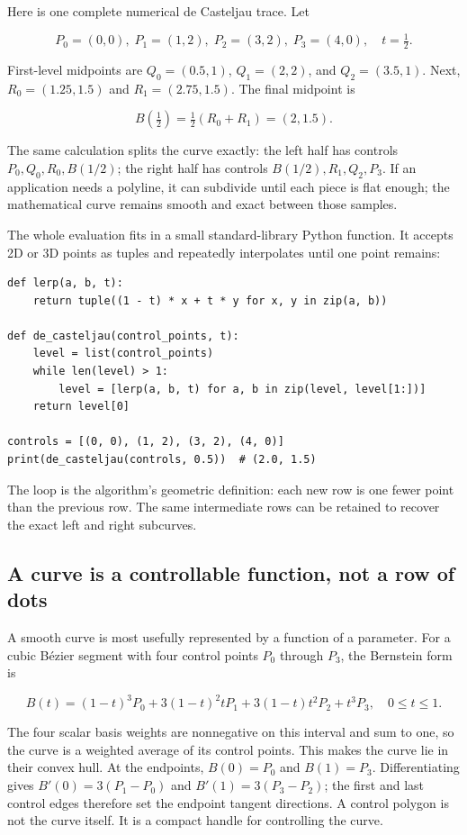 Here is one complete numerical de Casteljau trace. Let

\[
P_0=(0,0),\; P_1=(1,2),\; P_2=(3,2),\; P_3=(4,0),\quad t=\tfrac12.
\]

First-level midpoints are \(Q_0=(0.5,1)\), \(Q_1=(2,2)\), and \(Q_2=(3.5,1)\). Next, \(R_0=(1.25,1.5)\) and \(R_1=(2.75,1.5)\). The final midpoint is

\[
B(\tfrac12)=\tfrac12(R_0+R_1)=(2,1.5).
\]

The same calculation splits the curve exactly: the left half has controls \(P_0,Q_0,R_0,B(1/2)\); the right half has controls \(B(1/2),R_1,Q_2,P_3\). If an application needs a polyline, it can subdivide until each piece is flat enough; the mathematical curve remains smooth and exact between those samples.

The whole evaluation fits in a small standard-library Python function. It accepts 2D or 3D points as tuples and repeatedly interpolates until one point remains:

\begin{verbatim}
def lerp(a, b, t):
    return tuple((1 - t) * x + t * y for x, y in zip(a, b))

def de_casteljau(control_points, t):
    level = list(control_points)
    while len(level) > 1:
        level = [lerp(a, b, t) for a, b in zip(level, level[1:])]
    return level[0]

controls = [(0, 0), (1, 2), (3, 2), (4, 0)]
print(de_casteljau(controls, 0.5))  # (2.0, 1.5)
\end{verbatim}

The loop is the algorithm's geometric definition: each new row is one fewer point than the previous row. The same intermediate rows can be retained to recover the exact left and right subcurves.

\subsection{A curve is a controllable function, not a row of dots}\label{03-visual-computing-i-ch001-a-curve-is-a-controllable-function-not-a-row-of-dots}

A smooth curve is most usefully represented by a function of a parameter. For a cubic Bézier segment with four control points \(P_0\) through \(P_3\), the Bernstein form is

\[
B(t)=(1-t)^3P_0+3(1-t)^2tP_1+3(1-t)t^2P_2+t^3P_3,\quad 0\le t\le1.
\]

The four scalar basis weights are nonnegative on this interval and sum to one, so the curve is a weighted average of its control points. This makes the curve lie in their convex hull. At the endpoints, \(B(0)=P_0\) and \(B(1)=P_3\). Differentiating gives \(B'(0)=3(P_1-P_0)\) and \(B'(1)=3(P_3-P_2)\); the first and last control edges therefore set the endpoint tangent directions. A control polygon is not the curve itself. It is a compact handle for controlling the curve.

